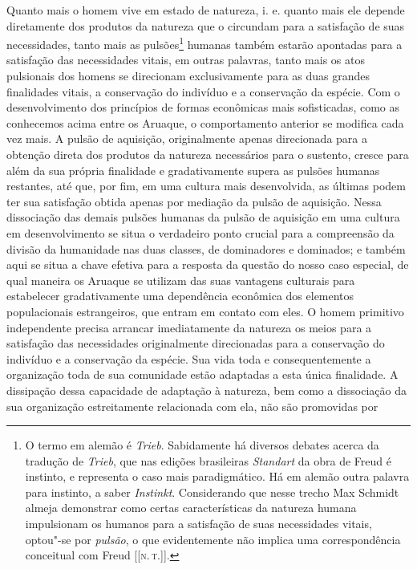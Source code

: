 Quanto mais o homem vive em estado de natureza, i. e. quanto mais ele
depende diretamente dos produtos da natureza que o circundam para a
satisfação de suas necessidades, tanto mais as pulsões\footnote{O termo em alemão é \emph{Trieb}. Sabidamente há diversos debates
  acerca da tradução de \emph{Trieb}, que nas edições brasileiras
  \emph{Standart} da obra de Freud é instinto, e representa o caso mais
  paradigmático. Há em alemão outra palavra para instinto, a saber
  \emph{Instinkt}. Considerando que nesse trecho Max Schmidt almeja
  demonstrar como certas características da natureza humana impulsionam os
  humanos para a satisfação de suas necessidades vitais, optou"-se por
  \emph{pulsão}, o que evidentemente não implica uma correspondência
  conceitual com Freud {[}{[}\textsc{n.\,t.}{]}{]}.} humanas também
estarão apontadas para a satisfação das necessidades vitais, em outras
palavras, tanto mais os atos pulsionais dos homens se direcionam
exclusivamente para as duas grandes finalidades vitais, a conservação
do indivíduo e a conservação da espécie. Com o desenvolvimento dos
princípios de formas econômicas mais sofisticadas, como as conhecemos
acima entre os Aruaque, o comportamento anterior se modifica cada vez
mais. A pulsão de aquisição, originalmente apenas direcionada para a
obtenção direta dos produtos da natureza necessários para o sustento,
cresce para além da sua própria finalidade e gradativamente supera as
pulsões humanas restantes, até que, por fim, em uma cultura mais
desenvolvida, as últimas podem ter sua satisfação obtida apenas por
mediação da pulsão de aquisição. Nessa dissociação das demais pulsões
humanas da pulsão de aquisição em uma cultura em desenvolvimento se
situa o verdadeiro ponto crucial para a compreensão da divisão da
humanidade nas duas classes, de dominadores e dominados; e também aqui
se situa a chave efetiva para a resposta da questão do nosso caso
especial, de qual maneira os Aruaque se utilizam das suas vantagens
culturais para estabelecer gradativamente uma dependência econômica
dos elementos populacionais estrangeiros, que entram em contato com
eles. O homem primitivo independente precisa arrancar imediatamente da
natureza os meios para a satisfação das necessidades originalmente
direcionadas para a conservação do indivíduo e a conservação da
espécie. Sua vida toda e consequentemente a organização toda de sua
comunidade estão adaptadas a esta única finalidade. A dissipação dessa
capacidade de adaptação à natureza, bem como a dissociação da sua
organização estreitamente relacionada com ela, não são promovidas por
